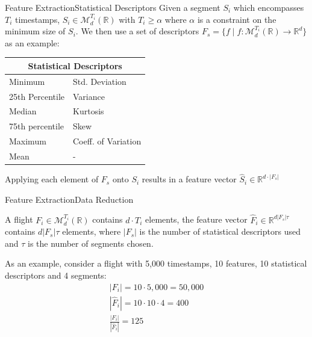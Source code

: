 \documentclass{beamer}
\begin{document}
            \begin{frame}{Feature Extraction}{Statistical Descriptors}
                Given a segment $S_{i}$ which encompasses $T_i$ timestamps, $S_i \in \mathcal{M}_{d}^{T_i}(\mathbb{R})$ with $T_i \geq \alpha$ where $\alpha$ is a constraint on the minimum size of $S_i$. We then use a set of descriptors $F_s = \{f \mid  f: \mathcal{M}_{d}^{T_i}(\mathbb{R}) \rightarrow \mathbb{R}^{d}\}$ as an example:
                \begin{table}[!htbp]
                    \begin{tabular}{ll}
                    \multicolumn{2}{c}{Statistical Descriptors} \\ \hline
                    Minimum & Std. Deviation \\
                    25th Percentile & Variance \\
                    Median & Kurtosis \\
                    75th percentile & Skew \\
                    Maximum & Coeff. of Variation \\
                    Mean & - \\ \hline
                    \end{tabular}
                \end{table}

                Applying each element of $F_s$ onto $S_i$ results in a feature vector $\hat{S}_i \in \mathbb{R}^{d \cdot |F_s|}$
            \end{frame}

            \begin{frame}{Feature Extraction}{Data Reduction}

                A flight $F_i \in \mathcal{M}_{d}^{T_i}(\mathbb{R})$ contains $d \cdot T_i$ elements, the feature vector $\hat{F}_i \in \mathbb{R}^{d |F_s| \tau}$ contains $ d |F_s| \tau$ elements, where $|F_s|$ is the number of statistical descriptors used and $\tau$ is the number of segments chosen.

                As an example, consider a flight with 5,000 timestamps, 10 features, 10 statistical descriptors and 4 segments:
                \begin{gather}
                    | F_i | = 10 \cdot 5,000 = 50,000 \\
                    | \hat{F}_i | = 10 \cdot 10 \cdot 4 = 400 \\
                    \frac{ | F_i | }{ | \hat{F}_i | } = 125 \label{eq:data-reduction}
                \end{gather}
            \end{frame}
\end{document}
